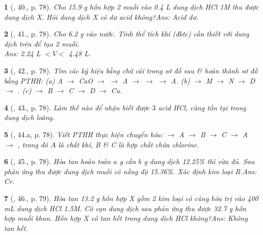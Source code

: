 \documentclass{article}
\newtheorem{baitoan}{}
\begin{document}
\begin{baitoan}[\cite{An_Hoa_Hoc_nang_cao_8_9}, 40., p. 78]
	Cho {\rm15.9 g} hỗn hợp 2 muối {\rm{}} vào {\rm0.4 L} dung dịch {\rm HCl 1M} thu được dung dịch X. Hỏi dung dịch X có dư acid không?\hfill{\sf Ans: Acid dư.}
\end{baitoan}

\begin{baitoan}[\cite{An_Hoa_Hoc_nang_cao_8_9}, 41., p. 78]
	Cho {\rm6.2 g } vào nước. Tính thể tích khí {\rm{}} (đktc) cần thiết với dung dịch trên để tạo 2 muối.\\\mbox{}\hfill{\sf Ans: 2.24 L $< V <$ 4.48 L.}
\end{baitoan}

\begin{baitoan}[\cite{An_Hoa_Hoc_nang_cao_8_9}, 42., p. 78]
	Tìm các ký hiệu bằng chữ cái trong sơ đồ sau \& hoàn thành sơ đồ bằng {\rm PTHH}: (a) {\rm A $\to$ CaO $\to$  $\to$ A $\to$  $\to$  $\to$ A}. (b) {\rm{} $\to$ M $\to$ N $\to$ D $\to$ }. (c) {\rm{} $\to$ B $\to$ C $\to$ D $\to$ Cu}.
\end{baitoan}

\begin{baitoan}[\cite{An_Hoa_Hoc_nang_cao_8_9}, 43., p. 78]
	Làm thế nào để nhận biết được $3$ acid {\rm HCl, } cùng tồn tại trong dung dịch loãng.	
\end{baitoan}

\begin{baitoan}[\cite{An_Hoa_Hoc_nang_cao_8_9}, 44.a, p. 78]
	Viết {\rm PTHH} thực hiện chuyển hóa: {\rm{} $\to$ A $\to$ B $\to$ C $\to$ A $\to$ }, trong đó $A$ là chất khí, B \& C là hợp chất chứa chlorine.
\end{baitoan}

\begin{baitoan}[\cite{An_Hoa_Hoc_nang_cao_8_9}, 45., p. 78]
	Hòa tan hoàn toàn $a$ {\rm g } cần $b$ {\rm g} dung dịch {\rm{} 12.25\%} thì vừa đủ. Sau phản ứng thu được dung dịch muối có nồng độ {\rm15.36\%}. Xác định kim loại R.\hfill{\sf Ans: Cr.}
\end{baitoan}

\begin{baitoan}[\cite{An_Hoa_Hoc_nang_cao_8_9}, 46., p. 79]
	Hòa tan {\rm13.2 g} hỗn hợp X gồm 2 kim loại có cùng hóa trị vào {\rm400 mL} dung dịch {\rm HCl 1.5M}. Cô cạn dung dịch sau phản ứng thu được {\rm32.7 g} hỗn hợp muối khan. Hỗn hợp X có tan hết trong dung dịch {\rm HCl} không?\hfill{\sf Ans: Không tan hết.}
\end{baitoan}
\end{document}
